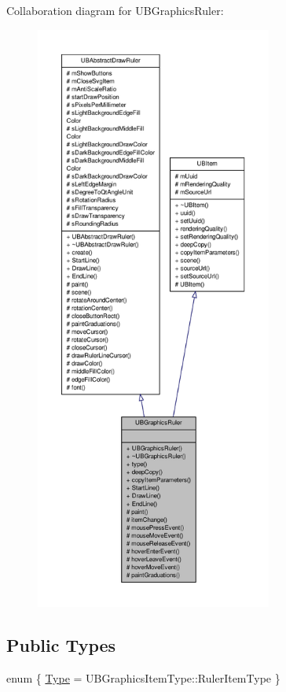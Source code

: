 Collaboration diagram for U\-B\-Graphics\-Ruler\-:
\nopagebreak
\begin{figure}[H]
\begin{center}
\leavevmode
\includegraphics[height=550pt]{dd/d36/class_u_b_graphics_ruler__coll__graph}
\end{center}
\end{figure}
\subsection*{Public Types}
\begin{DoxyCompactItemize}
\item 
enum \{ \hyperlink{class_u_b_graphics_ruler_a6a93f15a0ae10480f1ee4b27d848fa31a59bb52195bca06de6e5994df2025ae47}{Type} =  U\-B\-Graphics\-Item\-Type\-:\-:Ruler\-Item\-Type
 \}
\end{DoxyCompactItemize}
